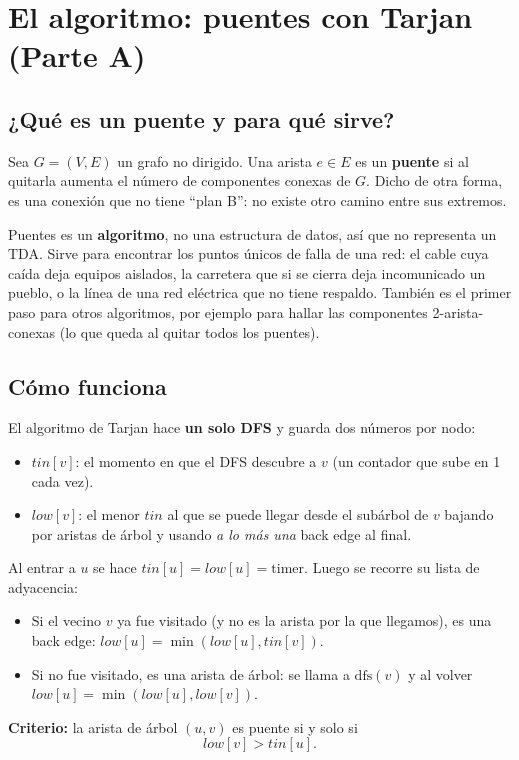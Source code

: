 \section{El algoritmo: puentes con Tarjan (Parte A)}

\subsection{¿Qué es un puente y para qué sirve?}
Sea $G=(V,E)$ un grafo no dirigido. Una arista $e\in E$ es un \textbf{puente} si al quitarla aumenta
el número de componentes conexas de $G$. Dicho de otra forma, es una conexión que no tiene ``plan B'':
no existe otro camino entre sus extremos.

Puentes es un \textbf{algoritmo}, no una estructura de datos, así que no representa un TDA. Sirve para
encontrar los puntos únicos de falla de una red: el cable cuya caída deja equipos aislados, la carretera
que si se cierra deja incomunicado un pueblo, o la línea de una red eléctrica que no tiene respaldo.
También es el primer paso para otros algoritmos, por ejemplo para hallar las componentes
2-arista-conexas (lo que queda al quitar todos los puentes).

\subsection{Cómo funciona}
El algoritmo de Tarjan hace \textbf{un solo DFS} y guarda dos números por nodo:
\begin{itemize}
  \item $\mathit{tin}[v]$: el momento en que el DFS descubre a $v$ (un contador que sube en 1 cada vez).
  \item $\mathit{low}[v]$: el menor $\mathit{tin}$ al que se puede llegar desde el subárbol de $v$ bajando
        por aristas de árbol y usando \emph{a lo más una} back edge al final.
\end{itemize}
Al entrar a $u$ se hace $\mathit{tin}[u]=\mathit{low}[u]=\text{timer}$. Luego se recorre su lista de
adyacencia:
\begin{itemize}
  \item Si el vecino $v$ ya fue visitado (y no es la arista por la que llegamos), es una back edge:
        $\mathit{low}[u]=\min(\mathit{low}[u],\mathit{tin}[v])$.
  \item Si no fue visitado, es una arista de árbol: se llama a $\mathrm{dfs}(v)$ y al volver
        $\mathit{low}[u]=\min(\mathit{low}[u],\mathit{low}[v])$.
\end{itemize}
\noindent\textbf{Criterio:} la arista de árbol $(u,v)$ es puente si y solo si
\[ \mathit{low}[v] > \mathit{tin}[u]. \]

